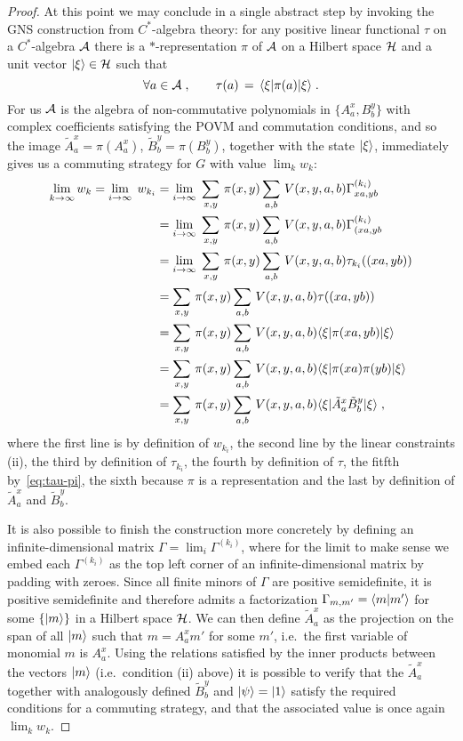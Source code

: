 \begin{proof}
At this point we may conclude in a single abstract step by invoking the GNS construction from $C^*$-algebra theory: for any positive linear functional $\tau$ on a $C^*$-algebra $\mathcal{A}$ there is a $*$-representation $\pi$ of $\mathcal{A}$ on a Hilbert space $\mathcal{H}$ and a unit vector $|\xi\rangle\in \mathcal{H}$ such that 
\begin{equation}\label{eq:tau-pi}
\forall a\in\mathcal{A}\;,\qquad \tau(a) \,=\, \langle\xi| \pi(a)|\xi\rangle\;.
\end{equation}
 For us $\mathcal{A}$ is the algebra of non-commutative polynomials in $\{A^x_a,B^y_b\}$ with complex coefficients satisfying the POVM and commutation conditions, and so the image $\tilde{A}^x_a = \pi(A^x_a)$, $\tilde{B}^y_b = \pi(B^y_b)$, together with the state $|\xi\rangle$, immediately gives us a commuting strategy for $G$ with value $\lim_k w_k$: 
\begin{align*}
\lim_{k\to\infty} w_k = \lim_{i\to\infty}\; w_{k_i} 
&= \lim_{i\to\infty} \;\sum_{x,y}\, \pi(x,y) \sum_{a,b} \, V(x,y,a,b) \Gamma^{(k_i)}_{xa,yb}\\
&= \lim_{i\to\infty} \;\sum_{x,y}\, \pi(x,y) \sum_{a,b} \, V(x,y,a,b) \Gamma^{(k_i)}_{(xa,yb}\\
&= \lim_{i\to\infty} \;\sum_{x,y}\, \pi(x,y) \sum_{a,b} \, V(x,y,a,b) \tau_{k_i}((xa,yb))\\
&= \sum_{x,y}\, \pi(x,y) \sum_{a,b} \, V(x,y,a,b) \tau((xa,yb))\\
&= \sum_{x,y}\, \pi(x,y) \sum_{a,b} \, V(x,y,a,b) \langle\xi| \pi(xa,yb) |\xi\rangle\\
&= \sum_{x,y}\, \pi(x,y) \sum_{a,b} \, V(x,y,a,b) \langle\xi| \pi(xa)\pi(yb) |\xi\rangle\\
&= \sum_{x,y}\, \pi(x,y) \sum_{a,b} \, V(x,y,a,b) \langle\xi| \tilde{A}^x_a \tilde{B}^y_b |\xi\rangle\;,
\end{align*}
where the first line is by definition of $w_{k_i}$, the second line by the linear constraints (ii), the third by definition of $\tau_{k_i}$, the fourth by definition of $\tau$, the fitfth by~\eqref{eq:tau-pi}, the sixth because $\pi$ is a representation and the last by definition of $\tilde{A}^x_a $ and $\tilde{B}^y_b$. 

It is also possible to finish the construction more concretely by defining an infinite-dimensional matrix $\Gamma = \lim_i \Gamma^{(k_i)}$, where for the limit to make sense we embed each $\Gamma^{(k_i)}$ as the top left corner of an infinite-dimensional matrix by padding with zeroes. Since all finite minors of $\Gamma$ are positive semidefinite, it is positive semidefinite and therefore admits a factorization $\Gamma_{m,m'} = \langle m|m'\rangle$ for some $\{|m\rangle\}$ in a Hilbert space $\mathcal{H}$. We can then define $\tilde{A}^x_a$ as the projection on the span of all $|m\rangle$ such that $m = A^x_a m' $ for some $m'$, i.e.\ the first variable of monomial $m$ is $A^x_a$. Using the relations satisfied by the inner products between the vectors $|m\rangle$ (i.e.\ condition (ii) above) it is possible to verify that the $\tilde{A}^x_a$ together with analogously defined $\tilde{B}^y_b$ and $|\psi\rangle = |1\rangle$ satisfy the required conditions for a commuting strategy, and that the associated value is once again $\lim_k w_k$.
\end{proof}

